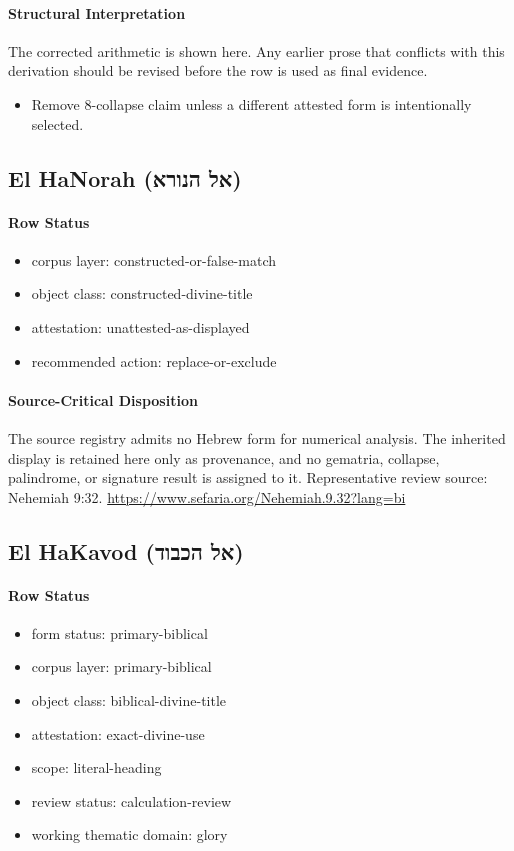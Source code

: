 \paragraph{Structural Interpretation}
The corrected arithmetic is shown here. Any earlier prose that conflicts with this derivation should be revised before the row is used as final evidence.

\begin{itemize}
\item Remove 8-collapse claim unless a different attested form is intentionally selected.
\end{itemize}

\subsection{El HaNorah (אל הנורא)}
\paragraph{Row Status}
\begin{itemize}
\item corpus layer: constructed-or-false-match
\item object class: constructed-divine-title
\item attestation: unattested-as-displayed
\item recommended action: replace-or-exclude
\end{itemize}
\paragraph{Source-Critical Disposition}
The source registry admits no Hebrew form for numerical analysis. The inherited display is retained here only as provenance, and no gematria, collapse, palindrome, or signature result is assigned to it.
Representative review source: Nehemiah 9:32.
\url{https://www.sefaria.org/Nehemiah.9.32?lang=bi}

\subsection{El HaKavod (אל הכבוד)}
\paragraph{Row Status}
\begin{itemize}
\item form status: primary-biblical
\item corpus layer: primary-biblical
\item object class: biblical-divine-title
\item attestation: exact-divine-use
\item scope: literal-heading
\item review status: calculation-review
\item working thematic domain: glory
\end{itemize}
